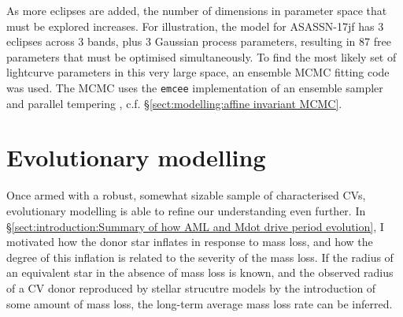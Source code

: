 As more eclipses are added, the number of dimensions in parameter space that must be explored increases. For illustration, the model for ASASSN-17jf has 3 eclipses across 3 bands, plus 3 Gaussian process parameters, resulting in 87 free parameters that must be optimised simultaneously. To find the most likely set of lightcurve parameters in this very large space, an ensemble MCMC fitting code was used. The MCMC uses the \texttt{emcee} implementation of an ensemble sampler and parallel tempering \citep{foreman2012}, c.f. \S\ref{sect:modelling:affine invariant MCMC}.



\section{Evolutionary modelling}\label{sect:method:evolutionary modelling}

Once armed with a robust, somewhat sizable sample of characterised CVs, evolutionary modelling is able to refine our understanding even further. In \S\ref{sect:introduction:Summary of how AML and Mdot drive period evolution}, I motivated how the donor star inflates in response to mass loss, and how the degree of this inflation is related to the severity of the mass loss.
If the radius of an equivalent star in the absence of mass loss is known, and the observed radius of a CV donor reproduced by stellar strucutre models by the introduction of some amount of mass loss, the long-term average mass loss rate can be inferred.

